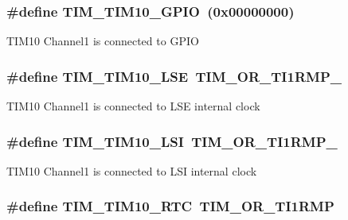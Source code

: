 \hypertarget{group___t_i_m_ex___remap_gaf7c4ce1f0999db337ec1706ed8a4c1c1}{
\subsubsection[{T\-I\-M\-\_\-\-T\-I\-M10\-\_\-\-G\-P\-I\-O}]{\setlength{\rightskip}{0pt plus 5cm}\#define T\-I\-M\-\_\-\-T\-I\-M10\-\_\-\-G\-P\-I\-O~(0x00000000)}}\label{group___t_i_m_ex___remap_gaf7c4ce1f0999db337ec1706ed8a4c1c1}
T\-I\-M10 Channel1 is connected to G\-P\-I\-O \hypertarget{group___t_i_m_ex___remap_ga149ca8942b96738acba1740aebb52914}{
\subsubsection[{T\-I\-M\-\_\-\-T\-I\-M10\-\_\-\-L\-S\-E}]{\setlength{\rightskip}{0pt plus 5cm}\#define T\-I\-M\-\_\-\-T\-I\-M10\-\_\-\-L\-S\-E~{\bf T\-I\-M\-\_\-\-O\-R\-\_\-\-T\-I1\-R\-M\-P\-\_}}}\label{group___t_i_m_ex___remap_ga149ca8942b96738acba1740aebb52914}
T\-I\-M10 Channel1 is connected to L\-S\-E internal clock \hypertarget{group___t_i_m_ex___remap_ga3232168ebecf2973088dfee75ceffe62}{
\subsubsection[{T\-I\-M\-\_\-\-T\-I\-M10\-\_\-\-L\-S\-I}]{\setlength{\rightskip}{0pt plus 5cm}\#define T\-I\-M\-\_\-\-T\-I\-M10\-\_\-\-L\-S\-I~{\bf T\-I\-M\-\_\-\-O\-R\-\_\-\-T\-I1\-R\-M\-P\-\_}}}\label{group___t_i_m_ex___remap_ga3232168ebecf2973088dfee75ceffe62}
T\-I\-M10 Channel1 is connected to L\-S\-I internal clock \hypertarget{group___t_i_m_ex___remap_ga286067059eb38127d949d72ba359a049}{
\subsubsection[{T\-I\-M\-\_\-\-T\-I\-M10\-\_\-\-R\-T\-C}]{\setlength{\rightskip}{0pt plus 5cm}\#define T\-I\-M\-\_\-\-T\-I\-M10\-\_\-\-R\-T\-C~{\bf T\-I\-M\-\_\-\-O\-R\-\_\-\-T\-I1\-R\-M\-P}}}\label{group___t_i_m_ex___remap_ga286067059eb38127d949d72ba359a049}
